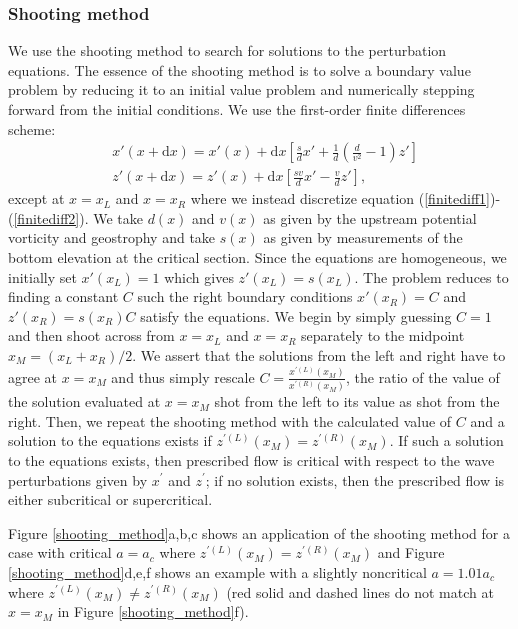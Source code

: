 \documentclass{jfm}
\begin{document}
\subsubsection{Shooting method}
We use the shooting method to search for solutions to the perturbation equations. The essence of the shooting method is to solve a boundary value problem by reducing it to an initial value problem and numerically stepping forward from the initial conditions. We use the first-order finite differences scheme:
\begin{align}
& x'(x+\text{d}x) = x'(x) + \text{d}x \left[ \frac{s}{d}x' + \frac{1}{d} \left( \frac{d}{v^{2}} - 1 \right) z' \right] \\
& z'(x+\text{d}x) = z'(x) + \text{d}x \left[ \frac{s v}{d} x' - \frac{v}{d}z' \right],
\end{align}
except at $x=x_{L}$ and $x=x_{R}$ where we instead discretize equation (\ref{finitediff1})-(\ref{finitediff2}). We take $d(x)$ and $v(x)$ as given by the upstream potential vorticity and geostrophy and take $s(x)$ as given by measurements of the bottom elevation at the critical section. Since the equations are homogeneous, we initially set $x'(x_{L})=1$ which gives $z'(x_{L})=s(x_{L})$. The problem reduces to finding a constant $C$ such the right boundary conditions $x'(x_{R}) = C$ and $z'(x_{R})=s(x_{R}) C$ satisfy the equations. We begin by simply guessing $C=1$ and then shoot across from $x=x_{L}$ and $x=x_{R}$ separately to the midpoint $x_{M}=(x_{L} + x_{R})/2$. We assert that the solutions from the left and right have to agree at $x=x_{M}$ and thus simply rescale $C = \frac{x^{\prime (L)}(x_{M})}{x^{\prime (R)}(x_{M})}$, the ratio of the value of the solution evaluated at $x=x_{M}$ shot from the left to its value as shot from the right. Then, we repeat the shooting method with the calculated value of $C$ and a solution to the equations exists if $z^{\prime (L)}(x_{M}) = z^{\prime (R)}(x_{M})$. If such a solution to the equations exists, then prescribed flow is critical with respect to the wave perturbations given by $x^{\prime}$ and $z^{\prime}$; if no solution exists, then the prescribed flow is either subcritical or supercritical.

Figure \ref{shooting_method}a,b,c shows an application of the shooting method for a case with critical $a=a_{c}$ where $z^{\prime (L)}(x_{M}) = z^{\prime (R)}(x_{M})$ and Figure \ref{shooting_method}d,e,f shows an example with a slightly noncritical $a=1.01 a_{c}$ where $z^{\prime (L)}(x_{M}) \neq z^{\prime (R)}(x_{M})$ (red solid and dashed lines do not match at $x=x_{M}$ in Figure \ref{shooting_method}f).
\end{document}
